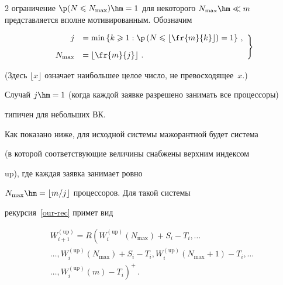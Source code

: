 \begin{multicols}{2}
ограничение  $\p(N\leqslant N_{\max})\hm=1$ для некоторого $N_{\max}\hm\ll

m$ представляется вполне мотивированным. Обозначим

\begin{equation}

\left.

\begin{array}{rl}

    j&=\min\left\{ k\geqslant 1:

    \p\left(N\leqslant\left\lfloor\fr{m}{k}\right\rfloor\right)=1\right\}\,,\\[9pt]

    N_{\max}&=\left\lfloor\fr{m}{j}\right\rfloor\,.

    \end{array}

    \right\}

    \label{e8-mr}

\end{equation}

(Здесь $\lfloor x \rfloor$ означает наибольшее целое число, не превосходящее~$x$.)

Случай $j\hm=1$ (когда каждой заявке разрешено занимать все процессоры)

типичен для небольших ВК.



Как показано ниже, для исходной  системы мажорантной будет система

(в которой соответствующие величины снабжены  верхним индексом

up), где каждая заявка занимает ровно

$N_{\max}\hm=\lfloor{m}/{j}\rfloor$ процессоров. Для такой системы

рекурсия~\eqref{our-rec} примет вид

\begin{multline}

W^{(\mathrm{up})}_{i+1}= R\left(  W^{(\mathrm{up})}_{i}(N_{\max})+S_{i}-T_{i},\ldots\right.\\

\ldots ,W^{(\mathrm{up})}_{i}(N_{\max})+S_{i}-T_{i},

W^{(\mathrm{up})}_{i}(N_{\max}+1)-T_{i},\ldots\\

\left.\ldots,W^{(\mathrm{up})}_{i}(m)-T_{i}\right)^{+}\,.

\label{up-rec}

\end{multline}




\end{multicols}
